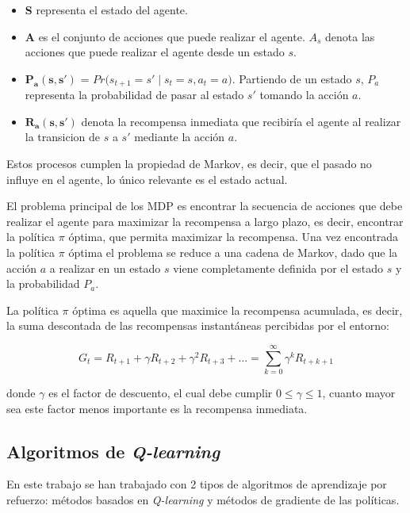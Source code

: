 \begin{itemize}
	\item \textbf{S} representa el estado del agente.
	\item \textbf{A} es el conjunto de acciones que puede realizar el agente. $A_s$ denota las acciones que puede realizar el agente desde un estado $s$.
	\item \textbf{$\boldsymbol{P_a(s,s')}$} = $Pr\big(s_{t+1} = s' \;|\; s_t = s , a_t = a  \big)$. Partiendo de un estado $s$, $P_a$ representa la probabilidad de pasar al estado $s'$ tomando la acción $a$.
	\item \textbf{$\boldsymbol{R_a(s,s')}$} denota la recompensa inmediata que recibiría el agente al realizar la transicion de $s$ a $s'$ mediante la acción $a$.
\end{itemize}

Estos procesos cumplen la propiedad de Markov, es decir, que el pasado no influye en el agente, lo único relevante es el estado actual.

El problema principal de los MDP es encontrar la secuencia de acciones que debe realizar el agente para maximizar la recompensa a largo plazo, es decir, encontrar la política $\pi$ 
óptima, que permita maximizar la recompensa. Una vez encontrada la política $\pi$ óptima el problema se reduce a una cadena de Markov, dado que la acción $a$ a realizar en un estado $s$ viene completamente definida por el estado $s$ y la probabilidad $P_a$. 

La política $\pi$ óptima es aquella que maximice la recompensa acumulada, es decir, la suma descontada de las recompensas instantáneas percibidas por el entorno:

\begin{equation}
	G_t = R_{t+1} + \gamma R_{t+2} + \gamma^2 R_{t+3} + ... = \sum_{k=0}^{\infty}\gamma^k R_{
	t+k+1}
\end{equation}

donde $\gamma$ es el factor de descuento, el cual debe cumplir $0 \le \gamma \le 1$, cuanto mayor sea este factor menos importante es la recompensa inmediata. 


\subsection{Algoritmos de \textit{Q-learning}}
En este trabajo se han trabajado con 2 tipos de algoritmos de aprendizaje por refuerzo: métodos basados en \textit{Q-learning} y métodos de gradiente de las políticas.


